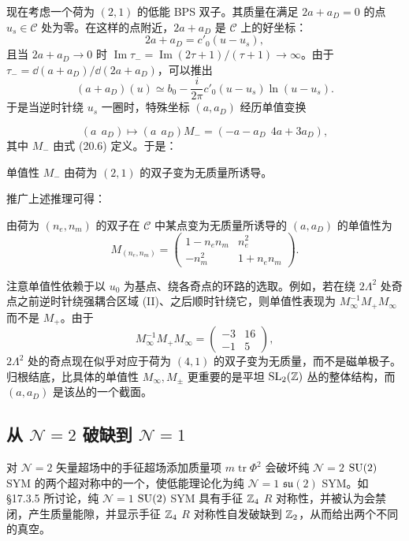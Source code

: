 现在考虑一个荷为 $(2,1)$ 的低能 BPS 双子。其质量在满足 $2a+a_D=0$ 的点 $u_s\in\mathcal{C}$ 处为零。在这样的点附近，$2a+a_D$ 是 $\mathcal{C}$ 上的好坐标：
\[
2a+a_D=c'_0(u-u_s),
\]
且当 $2a+a_D\to0$ 时 $\operatorname{Im}\tau_-=\operatorname{Im}(2\tau+1)/(\tau+1)\to\infty$。由于 $\tau_-=\dd(a+a_D)/\dd(2a+a_D)$，可以推出
\[
(a+a_D)(u)\simeq b_0-\frac{i}{2\pi}c'_0(u-u_s)\ln(u-u_s).
\]
于是当逆时针绕 $u_s$ 一圈时，特殊坐标 $(a,a_D)$ 经历单值变换

\[
(a\ \ a_D)\longmapsto(a\ \ a_D)M_-=(-a-a_D\ \ 4a+3a_D),
\]
其中 $M_-$ 由式 (20.6) 定义。于是：

\begin{proposition}[20.9]
单值性 $M_-$ 由荷为 $(2,1)$ 的双子变为无质量所诱导。
\end{proposition}

推广上述推理可得：

\begin{proposition}[20.10]
由荷为 $(n_e,n_m)$ 的双子在 $\mathcal{C}$ 中某点变为无质量所诱导的 $(a,a_D)$ 的单值性为
\[
M_{(n_e,n_m)}=\begin{pmatrix}1-n_en_m&n_e^2\\-n_m^2&1+n_en_m\end{pmatrix}.
\]
\end{proposition}

\begin{remark}[20.11]
注意单值性依赖于以 $u_0$ 为基点、绕各奇点的环路的选取。例如，若在绕 $2\Lambda^2$ 处奇点之前逆时针绕强耦合区域 (II)、之后顺时针绕它，则单值性表现为 $M_\infty^{-1}M_+M_\infty$ 而不是 $M_+$。由于
\[
M_\infty^{-1}M_+M_\infty=\begin{pmatrix}-3&16\\-1&5\end{pmatrix},
\]
$2\Lambda^2$ 处的奇点现在似乎对应于荷为 $(4,1)$ 的双子变为无质量，而不是磁单极子。归根结底，比具体的单值性 $M_\infty,M_\pm$ 更重要的是平坦 $\operatorname{SL}_2(\mathbb{Z})$ 丛的整体结构，而 $(a,a_D)$ 是该丛的一个截面。
\end{remark}

\subsection{从 $\mathcal{N}=2$ 破缺到 $\mathcal{N}=1$}

对 $\mathcal{N}=2$ 矢量超场中的手征超场添加质量项 $m\operatorname{tr}\Phi^2$ 会破坏纯 $\mathcal{N}=2$ $\operatorname{SU}(2)$ SYM 的两个超对称中的一个，使低能理论化为纯 $\mathcal{N}=1$ $\mathfrak{su}(2)$ SYM。如 §17.3.5 所讨论，纯 $\mathcal{N}=1$ $\operatorname{SU}(2)$ SYM 具有手征 $\mathbb{Z}_4$ $R$ 对称性，并被认为会禁闭，产生质量能隙，并显示手征 $\mathbb{Z}_4$ $R$ 对称性自发破缺到 $\mathbb{Z}_2$，从而给出两个不同的真空。

